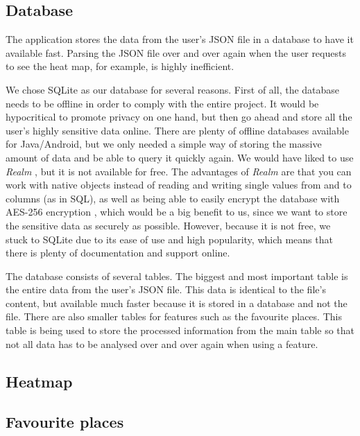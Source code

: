 \documentclass[12p]{article}
\begin{document}
    \subsection{Database}
    
    The application stores the data from the user's JSON file in a database to have it available fast. Parsing the JSON file over and over again when the user requests to see the heat map, for example, is highly inefficient.
    
    We chose SQLite as our database for several reasons. First of all, the database needs to be offline in order to comply with the entire project. It would be hypocritical to promote privacy on one hand, but then go ahead and store all the user's highly sensitive data online. There are plenty of offline databases available for Java/Android, but we only needed a simple way of storing the massive amount of data and be able to query it quickly again. We would have liked to use \textit{Realm} \cite{Realm}, but it is not available for free. The advantages of \textit{Realm} are that you can work with native objects instead of reading and writing single values from and to columns (as in SQL), as well as being able to easily encrypt the database with AES-256 encryption \cite{RealmFeatures}, which would be a big benefit to us, since we want to store the sensitive data as securely as possible. However, because it is not free, we stuck to SQLite due to its ease of use and high popularity, which means that there is plenty of documentation and support online.
    
    The database consists of several tables. The biggest and most important table is the entire data from the user's JSON file. This data is identical to the file's content, but available much faster because it is stored in a database and not the file. There are also smaller tables for features such as the favourite places. This table is being used to store the processed information from the main table so that not all data has to be analysed over and over again when using a feature.
    
    \subsection{Heatmap}
    
    \subsection{Favourite places}
    
\end{document}
